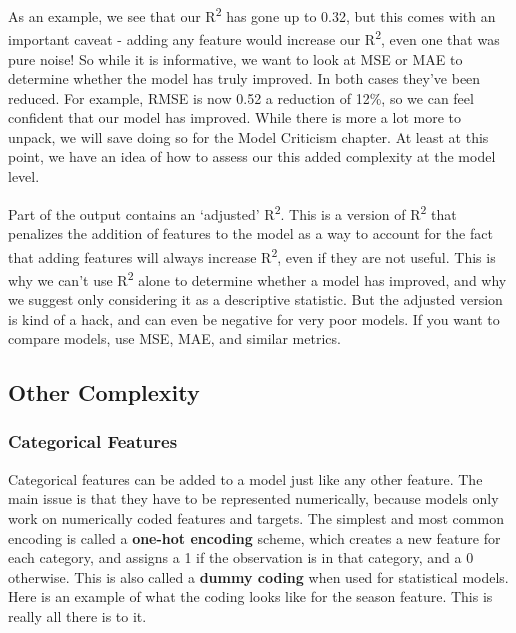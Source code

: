\documentclass[
  letterpaper,
]{krantz}
\begin{document}
As an example, we see that our R\textsuperscript{2} has gone up to 0.32,
but this comes with an important caveat - adding any feature would
increase our R\textsuperscript{2}, even one that was pure noise! So
while it is informative, we want to look at MSE or MAE to determine
whether the model has truly improved. In both cases they've been
reduced. For example, RMSE is now 0.52 a reduction of 12\%, so we can
feel confident that our model has improved. While there is more a lot
more to unpack, we will save doing so for the Model Criticism chapter.
At least at this point, we have an idea of how to assess our this added
complexity at the model level.

\begin{tcolorbox}[enhanced jigsaw, titlerule=0mm, colbacktitle=quarto-callout-note-color!10!white, title=\textcolor{quarto-callout-note-color}{\faInfo}\hspace{0.5em}{Adjusted R\textsuperscript{2}}, bottomtitle=1mm, rightrule=.15mm, colframe=quarto-callout-note-color-frame, colback=white, opacityback=0, left=2mm, arc=.35mm, toptitle=1mm, bottomrule=.15mm, leftrule=.75mm, toprule=.15mm, coltitle=black, breakable, opacitybacktitle=0.6]

Part of the output contains an `adjusted' R\textsuperscript{2}. This is
a version of R\textsuperscript{2} that penalizes the addition of
features to the model as a way to account for the fact that adding
features will always increase R\textsuperscript{2}, even if they are not
useful. This is why we can't use R\textsuperscript{2} alone to determine
whether a model has improved, and why we suggest only considering it as
a descriptive statistic. But the adjusted version is kind of a hack, and
can even be negative for very poor models. If you want to compare
models, use MSE, MAE, and similar metrics.

\end{tcolorbox}

\subsection{Other Complexity}\label{other-complexity}

\subsubsection{Categorical Features}\label{categorical-features}

Categorical features can be added to a model just like any other
feature. The main issue is that they have to be represented numerically,
because models only work on numerically coded features and targets. The
simplest and most common encoding is called a \textbf{one-hot encoding}
scheme, which creates a new feature for each category, and assigns a 1
if the observation is in that category, and a 0 otherwise. This is also
called a \textbf{dummy coding} when used for statistical models. Here is
an example of what the coding looks like for the season feature. This is
really all there is to it.
\end{document}
